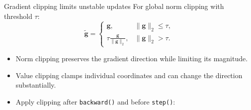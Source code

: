 
\begin{frame}[fragile]{Gradient clipping limits unstable updates}
For global norm clipping with threshold $\tau$:
\[
  \tilde{\bm g}=
  \begin{cases}
    \bm g, & \lVert\bm g\rVert_2\leq\tau,\\[0.4em]
    \displaystyle\tau\frac{\bm g}{\lVert\bm g\rVert_2},
      & \lVert\bm g\rVert_2>\tau.
  \end{cases}
\]

\begin{itemize}
  \item Norm clipping preserves the gradient direction while limiting its magnitude.
  \item Value clipping clamps individual coordinates and can change the direction substantially.
  \item Apply clipping after \texttt{backward()} and before \texttt{step()}:
\end{itemize}


\end{frame}



